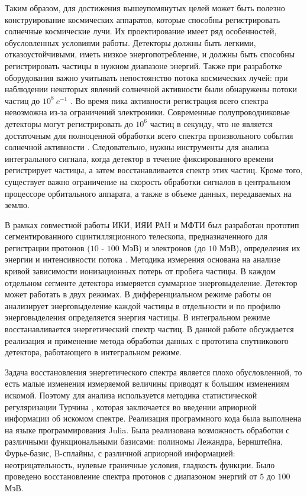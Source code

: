\documentclass{config}
\begin{document}
Таким образом, для достижения вышеупомянутых целей может быть полезно конструирование космических аппаратов, которые способны регистрировать солнечные космические лучи.
Их проектирование имеет ряд особенностей, обусловленных условиями работы. Детекторы должны быть легкими, отказоустойчивыми, иметь низкое энергопотребление, и должны быть способны регистрировать частицы в нужном диапазоне энергий. Также при разработке оборудования важно учитывать непостоянство потока космических лучей: при наблюдении некоторых явлений солнечной активности были обнаружены потоки частиц до $10^8~c^{-1}$ \cite{real_energy_spectrum}. Во время пика активности регистрация всего спектра невозможна из-за ограничений электроники. Современные полупроводниковые детекторы могут регистрировать до $10^6$ частиц в секунду, что не является достаточным для полноценной обработки всего спектра произвольного события солнечной активности \cite{sipm}. Следовательно, нужны инструменты для анализа интегрального сигнала, когда детектор в течение фиксированного времени регистрирует частицы, а затем восстанавливается спектр этих частиц. Кроме того, существует важно ограничение на скорость обработки сигналов в центральном процессоре орбитального аппарата, а также в объеме данных, передаваемых на землю.

В рамках совместной работы ИКИ, ИЯИ РАН и МФТИ был разработан прототип сегментированного сцинтилляционного телескопа, предназначенного для регистрации протонов ($10$ - $100$ МэВ) и электронов (до $10$ МэВ), определения их энергии и интенсивности потока \cite{detector_construction}. Методика измерения основана на анализе кривой зависимости ионизационных потерь от пробега частицы. В каждом отдельном сегменте детектора измеряется суммарное энерговыделение. Детектор может работать в двух режимах. В дифференциальном режиме работы он анализирует энерговыделение каждой частицы в отдельности и по профилю энерговыделения определяется энергия частицы. В интегральном режиме восстанавливается энергетический спектр частиц. В данной работе обсуждается реализация и применение метода обработки данных с прототипа спутникового детектора, работающего в интегральном режиме.

Задача восстановления энергетического спектра является плохо обусловленной, то есть малые изменения измеряемой величины приводят к большим изменениям искомой. Поэтому для анализа используется методика статистической регуляризации Турчина \cite{turchin2}, которая заключается во введении априорной информации об искомом спектре. Реализация программного кода была выполнена на языке программирования Julia. Была реализована возможность обработки с различными функциональными базисами: полиномы Лежандра, Бернштейна, Фурье-базис, B-сплайны, с различной априорной информацией: неотрицательность, нулевые граничные условия, гладкость функции. Было проведено восстановление спектра протонов с диапазоном энергий от $5$ до $100$ МэВ.
\end{document}
